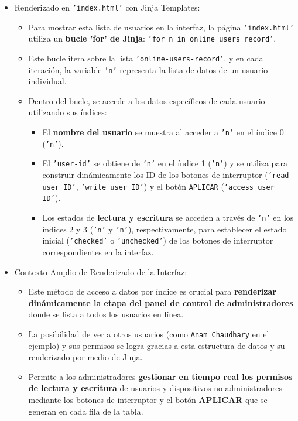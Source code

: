 \documentclass{report}
\begin{document}
\begin{itemize}
    \item Renderizado en \texttt{'index.html'} con Jinja Templates:
    \begin{itemize}
        \item Para mostrar esta lista de usuarios en la interfaz, la página \texttt{'index.html'} utiliza un \textbf{bucle 'for' de Jinja}: 
        \texttt{'for n in online users record'}.
        \item Este bucle itera sobre la lista \texttt{'online-users-record'}, y en cada iteración, la variable \texttt{'n'} representa la lista de 
        datos de un usuario individual.
        \item Dentro del bucle, se accede a los datos específicos de cada usuario utilizando sus índices:
        \begin{itemize}
            \item El \textbf{nombre del usuario} se muestra al acceder a \texttt{'n'} en el índice 0 (\texttt{'n'}).
            \item El \texttt{'user-id'} se obtiene de \texttt{'n'} en el índice 1 (\texttt{'n'}) y se utiliza para construir dinámicamente los ID de 
            los botones de interruptor (\texttt{'read user ID'}, \texttt{'write user ID'}) y el botón \texttt{APLICAR} (\texttt{'access user ID'}).
            \item Los estados de \textbf{lectura y escritura} se acceden a través de \texttt{'n'} en los índices 2 y 3 (\texttt{'n'} y \texttt{'n'}), 
            respectivamente, para establecer el estado inicial (\texttt{'checked'} o \texttt{'unchecked'}) de los botones de interruptor correspondientes 
            en la interfaz.
        \end{itemize}
    \end{itemize}

    \item Contexto Amplio de Renderizado de la Interfaz:
    \begin{itemize}
        \item Este método de acceso a datos por índice es crucial para \textbf{renderizar dinámicamente la etapa del panel de control de administradores} 
        donde se lista a todos los usuarios en línea.
        \item La posibilidad de ver a otros usuarios (como \texttt{Anam Chaudhary} en el ejemplo) y sus permisos se logra gracias a esta estructura de 
        datos y su renderizado por medio de Jinja.
        \item Permite a los administradores \textbf{gestionar en tiempo real los permisos de lectura y escritura} de usuarios y dispositivos no 
        administradores mediante los botones de interruptor y el botón \textbf{APLICAR} que se generan en cada fila de la tabla.    
    \end{itemize}
\end{itemize}
\end{document}
